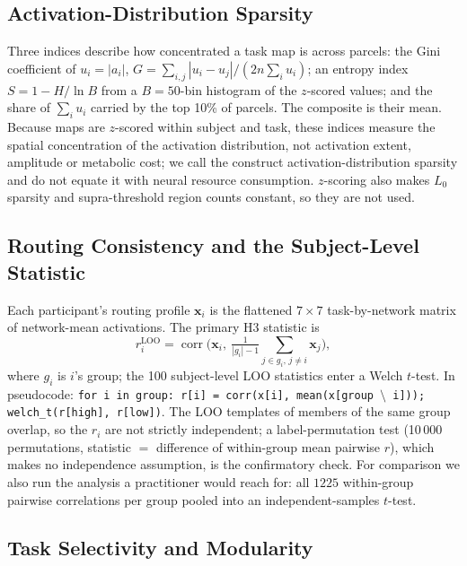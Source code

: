 \documentclass[conference]{IEEEtran}
\begin{document}
\subsection{Activation-Distribution Sparsity}

Three indices describe how concentrated a task map is across parcels: the Gini coefficient of $u_i = |a_i|$, $G = \sum_{i,j}|u_i - u_j| / (2n\sum_i u_i)$; an entropy index $S = 1 - H/\ln B$ from a $B = 50$-bin histogram of the $z$-scored values; and the share of $\sum_i u_i$ carried by the top 10\% of parcels. The composite is their mean. Because maps are $z$-scored within subject and task, these indices measure the spatial concentration of the activation distribution, not activation extent, amplitude or metabolic cost; we call the construct activation-distribution sparsity and do not equate it with neural resource consumption. $z$-scoring also makes $L_0$ sparsity and supra-threshold region counts constant, so they are not used.

\subsection{Routing Consistency and the Subject-Level Statistic}\label{sec:loo}

Each participant's routing profile $\mathbf{x}_i$ is the flattened $7 \times 7$ task-by-network matrix of network-mean activations. The primary H3 statistic is
\begin{equation}
r_i^{\mathrm{LOO}} = \operatorname{corr}\Big(\mathbf{x}_i,\ \tfrac{1}{|g_i|-1}\textstyle\sum_{j \in g_i,\, j \neq i} \mathbf{x}_j\Big),
\end{equation}
where $g_i$ is $i$'s group; the 100 subject-level LOO statistics enter a Welch $t$-test. In pseudocode: \texttt{for i in group: r[i] = corr(x[i], mean(x[group $\setminus$ i])); welch\_t(r[high], r[low])}. The LOO templates of members of the same group overlap, so the $r_i$ are not strictly independent; a label-permutation test (10\,000 permutations, statistic $=$ difference of within-group mean pairwise $r$), which makes no independence assumption, is the confirmatory check. For comparison we also run the analysis a practitioner would reach for: all $1225$ within-group pairwise correlations per group pooled into an independent-samples $t$-test.

\subsection{Task Selectivity and Modularity}
\end{document}
